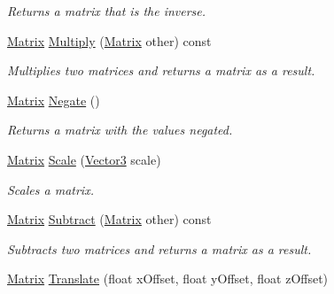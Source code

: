 \begin{DoxyCompactItemize}
\begin{DoxyCompactList}\small\item\em Returns a matrix that is the inverse. \end{DoxyCompactList}\item 
\hypertarget{struct_jade_1_1_math_1_1_matrix_a449adacaa4ef60d602e95f73d0d12c8a}{}\hyperlink{struct_jade_1_1_math_1_1_matrix}{Matrix} \hyperlink{struct_jade_1_1_math_1_1_matrix_a449adacaa4ef60d602e95f73d0d12c8a}{Multiply} (\hyperlink{struct_jade_1_1_math_1_1_matrix}{Matrix} other) const \label{struct_jade_1_1_math_1_1_matrix_a449adacaa4ef60d602e95f73d0d12c8a}

\begin{DoxyCompactList}\small\item\em Multiplies two matrices and returns a matrix as a result. \end{DoxyCompactList}\item 
\hypertarget{struct_jade_1_1_math_1_1_matrix_a606d14bf38bf0b407b6c5c9a3faa6d83}{}\hyperlink{struct_jade_1_1_math_1_1_matrix}{Matrix} \hyperlink{struct_jade_1_1_math_1_1_matrix_a606d14bf38bf0b407b6c5c9a3faa6d83}{Negate} ()\label{struct_jade_1_1_math_1_1_matrix_a606d14bf38bf0b407b6c5c9a3faa6d83}

\begin{DoxyCompactList}\small\item\em Returns a matrix with the values negated. \end{DoxyCompactList}\item 
\hypertarget{struct_jade_1_1_math_1_1_matrix_a1834433c1c1dc633b8e5f9094707dc5f}{}\hyperlink{struct_jade_1_1_math_1_1_matrix}{Matrix} \hyperlink{struct_jade_1_1_math_1_1_matrix_a1834433c1c1dc633b8e5f9094707dc5f}{Scale} (\hyperlink{struct_jade_1_1_math_1_1_vector3}{Vector3} scale)\label{struct_jade_1_1_math_1_1_matrix_a1834433c1c1dc633b8e5f9094707dc5f}

\begin{DoxyCompactList}\small\item\em Scales a matrix. \end{DoxyCompactList}\item 
\hypertarget{struct_jade_1_1_math_1_1_matrix_af5c307e7450771500c0b1199f7f04096}{}\hyperlink{struct_jade_1_1_math_1_1_matrix}{Matrix} \hyperlink{struct_jade_1_1_math_1_1_matrix_af5c307e7450771500c0b1199f7f04096}{Subtract} (\hyperlink{struct_jade_1_1_math_1_1_matrix}{Matrix} other) const \label{struct_jade_1_1_math_1_1_matrix_af5c307e7450771500c0b1199f7f04096}

\begin{DoxyCompactList}\small\item\em Subtracts two matrices and returns a matrix as a result. \end{DoxyCompactList}\item 
\hypertarget{struct_jade_1_1_math_1_1_matrix_a4495da566dae37f1b4c75e4beae7b6bc}{}\hyperlink{struct_jade_1_1_math_1_1_matrix}{Matrix} \hyperlink{struct_jade_1_1_math_1_1_matrix_a4495da566dae37f1b4c75e4beae7b6bc}{Translate} (float x\+Offset, float y\+Offset, float z\+Offset)\label{struct_jade_1_1_math_1_1_matrix_a4495da566dae37f1b4c75e4beae7b6bc}


\end{DoxyCompactItemize}
